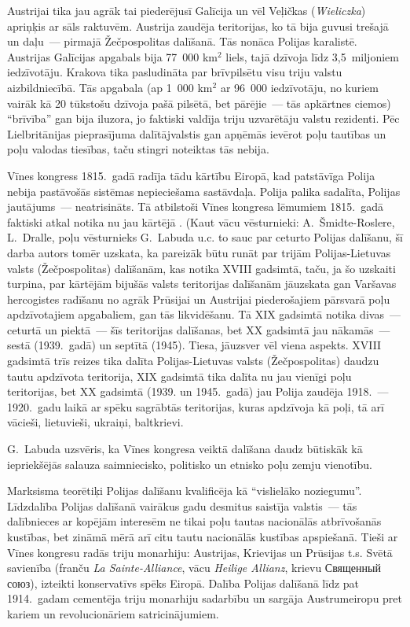 \documentclass[twoside,a5paper,12pt,fleqn,openany]{extbook}
\newcommand{\pltxti}[1]{\textit{\textpolish{#1}}}
\newcommand{\rutxti}[1]{\textrussian{#1}}
\newcommand{\detxti}[1]{\textit{\textgerman{#1}}}
\newcommand{\frtxti}[1]{\textit{\textfrench{#1}}}
\begin{document}
Austrijai tika jau agrāk tai piederējusī Galīcija un vēl Veļičkas (\pltxti{Wieliczka}) apriņķis ar sāls raktuvēm. Austrija zaudēja teritorijas, ko tā bija guvusi trešajā un daļu~--- pirmajā Žečpospolitas dalīšanā. Tās nonāca Polijas karalistē. Austrijas Galīcijas apgabals bija 77~000 km$^{2}$ liels, tajā dzīvoja līdz 3,5~miljoniem iedzīvotāju. Krakova tika pasludināta par brīvpilsētu visu triju valstu aizbildniecībā. Tās apgabala (ap 1~000 km$^{2}$ ar 96~000 iedzīvotāju, no kuriem vairāk kā 20 tūkstošu dzīvoja pašā pilsētā, bet pārējie~--- tās apkārtnes ciemos) ``brīvība'' gan bija iluzora, jo faktiski valdīja triju uzvarētāju valstu rezidenti. Pēc Lielbritānijas pieprasījuma dalītājvalstis gan apņēmās ievērot poļu tautības un poļu valodas tiesības, taču stingri noteiktas tās nebija.

Vīnes kongress 1815.~gadā radīja tādu kārtību Eiropā, kad patstāvīga Polija nebija pastāvošās sistēmas nepieciešama sastāvdaļa. Polija palika sadalīta, Polijas jautājums~--- neatrisināts. Tā atbilstoši Vīnes kongresa lēmumiem 1815.~gadā faktiski atkal notika nu jau kārtējā . (Kaut vācu vēsturnieki: A.~Šmidte-Roslere, L.~Dralle, poļu vēsturnieks G.~Labuda u.c. to sauc par ceturto Polijas dalīšanu, šī darba autors tomēr uzskata, ka pareizāk būtu runāt par trijām Polijas-Lietuvas valsts (Žečpospolitas) dalīšanām, kas notika XVIII gadsimtā, taču, ja šo uzskaiti turpina, par kārtējām bijušās valsts teritorijas dalīšanām jāuzskata gan Varšavas hercogistes radīšanu no agrāk Prūsijai un Austrijai piederošajiem pārsvarā poļu apdzīvotajiem apgabaliem, gan tās likvidēšanu. Tā XIX gadsimtā notika divas~--- ceturtā un piektā~--- šīs teritorijas dalīšanas, bet XX gadsimtā jau nākamās~--- sestā (1939.~gadā) un septītā (1945). Tiesa, jāuzsver vēl viena aspekts. XVIII gadsimtā trīs reizes tika dalīta Polijas-Lietuvas valsts (Žečpospolitas) daudzu tautu apdzīvota teritorija, XIX gadsimtā tika dalīta nu jau vienīgi poļu teritorijas, bet XX gadsimtā (1939. un 1945.~gadā) jau Polija zaudēja 1918.~--- 1920.~gadu laikā ar spēku sagrābtās teritorijas, kuras apdzīvoja kā poļi, tā arī vācieši, lietuvieši, ukraiņi, baltkrievi.

G.~Labuda uzsvēris, ka Vīnes kongresa veiktā dalīšana daudz būtiskāk kā iepriekšējās salauza saimniecisko, politisko un etnisko poļu zemju vienotību.

Marksisma teorētiķi Polijas dalīšanu kvalificēja kā ``vislielāko noziegumu''. Līdzdalība Polijas dalīšanā vairākus gadu desmitus saistīja valstis~--- tās dalībnieces ar kopējām interesēm ne tikai poļu tautas nacionālās atbrīvošanās kustības, bet zināmā mērā arī citu tautu nacionālās kustības apspiešanā. Tieši ar Vīnes kongresu radās triju monarhiju: Austrijas, Krievijas un Prūsijas t.s. Svētā savienība (franču \frtxti{La Sainte-Alliance}, vācu \detxti{Heilige Allianz}, krievu \rutxti{Священный союз}), izteikti konservatīvs spēks Eiropā. Dalība Polijas dalīšanā līdz pat 1914.~gadam cementēja triju monarhiju sadarbību un sargāja Austrumeiropu pret kariem un revolucionāriem satricinājumiem.
\end{document}
